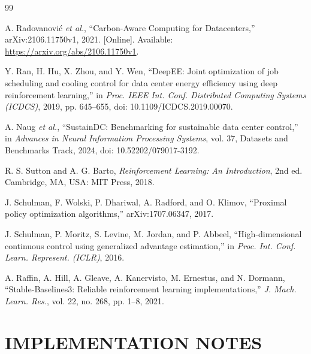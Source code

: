 \documentclass{UNCC-thesis}
\begin{document}
\fbmatterchapterformat

\begin{thebibliography}{99}

A. Radovanovi\'{c} \emph{et al.}, ``Carbon-Aware Computing for Datacenters,''
arXiv:2106.11750v1, 2021. [Online]. Available:
\url{https://arxiv.org/abs/2106.11750v1}.

Y. Ran, H. Hu, X. Zhou, and Y. Wen, ``DeepEE: Joint optimization of job
scheduling and cooling control for data center energy efficiency using deep
reinforcement learning,'' in \emph{Proc. IEEE Int. Conf. Distributed
Computing Systems (ICDCS)}, 2019, pp. 645--655,
doi: 10.1109/ICDCS.2019.00070.

A. Naug \emph{et al.}, ``SustainDC: Benchmarking for sustainable data center
control,'' in \emph{Advances in Neural Information Processing Systems},
vol. 37, Datasets and Benchmarks Track, 2024,
doi: 10.52202/079017-3192.

R. S. Sutton and A. G. Barto, \emph{Reinforcement Learning: An Introduction},
2nd ed. Cambridge, MA, USA: MIT Press, 2018.

J. Schulman, F. Wolski, P. Dhariwal, A. Radford, and O. Klimov, ``Proximal
policy optimization algorithms,'' arXiv:1707.06347, 2017.

J. Schulman, P. Moritz, S. Levine, M. Jordan, and P. Abbeel,
``High-dimensional continuous control using generalized advantage
estimation,'' in \emph{Proc. Int. Conf. Learn. Represent. (ICLR)}, 2016.

A. Raffin, A. Hill, A. Gleave, A. Kanervisto, M. Ernestus, and N. Dormann,
``Stable-Baselines3: Reliable reinforcement learning implementations,''
\emph{J. Mach. Learn. Res.}, vol. 22, no. 268, pp. 1--8, 2021.

\end{thebibliography}

\clearpage
{}
\renewcommand{\chaptertitlename}{APPENDIX}
\appendix

\chapter{IMPLEMENTATION NOTES}
\raggedright
\setlength{\parindent}{.17in}
\label{app:implementation}
\end{document}
